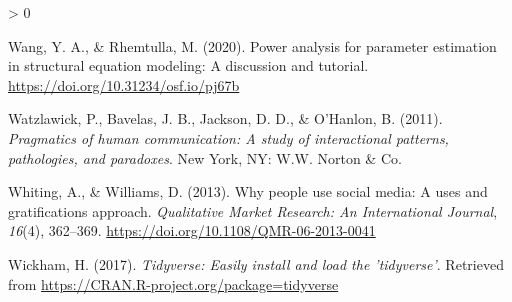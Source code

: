 \documentclass[
  english,
  man,floatsintext]{apa6}
\newlength{\cslhangindent}
\newenvironment{CSLReferences}[2] %
 {%
  \setlength{\parindent}{0pt}
  \ifodd #1 \everypar{\setlength{\hangindent}{\cslhangindent}}\ignorespaces\fi
  \ifnum #2 > 0
  \setlength{\parskip}{#2\baselineskip}
  \fi
 }%
 {}
\begin{document}
\begin{CSLReferences}{1}{0}
\leavevmode\hypertarget{ref-wangPowerAnalysisParameter2020}{}%
Wang, Y. A., \& Rhemtulla, M. (2020). Power analysis for parameter estimation in structural equation modeling: {A} discussion and tutorial. \url{https://doi.org/10.31234/osf.io/pj67b}

\leavevmode\hypertarget{ref-watzlawickPragmaticsHumanCommunication2011}{}%
Watzlawick, P., Bavelas, J. B., Jackson, D. D., \& O'Hanlon, B. (2011). \emph{Pragmatics of human communication: {A} study of interactional patterns, pathologies, and paradoxes}. New York, NY: W.W. Norton \& Co.

\leavevmode\hypertarget{ref-whitingWhyPeopleUse2013}{}%
Whiting, A., \& Williams, D. (2013). Why people use social media: A uses and gratifications approach. \emph{Qualitative Market Research: An International Journal}, \emph{16}(4), 362--369. \url{https://doi.org/10.1108/QMR-06-2013-0041}

\leavevmode\hypertarget{ref-R-tidyverse}{}%
Wickham, H. (2017). \emph{Tidyverse: Easily install and load the 'tidyverse'}. Retrieved from \url{https://CRAN.R-project.org/package=tidyverse}

\end{CSLReferences}
\end{document}

